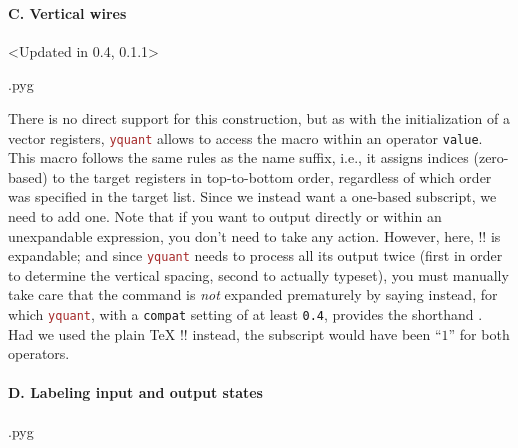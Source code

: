 \documentclass{scrartcl}
\makeatletter
\newenvironment{codeexample}{%
   \VerbatimEnvironment%
   \let\FVB@VerbatimOut\minted@FVB@VerbatimOut
   \let\FVE@VerbatimOut\minted@FVE@VerbatimOut
   \minted@configlang{tex}%
   \minted@fvset
   \begin{VerbatimOut}[codes={\catcode`\^^I=12},firstline,lastline]{\minted@jobname.pyg}%
}{
   \end{VerbatimOut}%
   \minted@langlinenoson%
   \savebox\codeexamplebox{ \minted@jobname.pyg}%
   \ifdim\wd\codeexamplebox>\dimexpr.5\linewidth-3mm\relax%
      \wd\codeexamplebox=.5\linewidth%
   \else%
      \wd\codeexamplebox=\dimexpr\wd\codeexamplebox+3mm\relax%
   \fi%
   \noindent\begin{minipage}{\wd\codeexamplebox}%
      \centering%
      \usebox\codeexamplebox%
   \end{minipage}%
   \begin{minipage}{\dimexpr\linewidth-\wd\codeexamplebox\relax}%
      \expandafter\minted@pygmentize\expandafter{\minted@lang}%
   \end{minipage}%
   \minted@langlinenosoff%
   \par%
}
\def\pkg#1{\textcolor{brown}{\texttt{#1}}}
\def\ttlink{\link\texttt}
\def\texlink{\link\tex}
\def\Yquant{\pkg{yquant}}
\makeatother
\begin{document}
            \paragraph{C. Vertical wires}\leavevmode
               \begin{example}<Updated in 0.4, 0.1.1>
                  \begin{codeexample}
                  \end{codeexample}
                  There is no direct support for this construction, but as with the initialization of a vector registers, \Yquant{} allows to access the macro \texlink{\idx} within an operator \ttlink{value}.
                  This macro follows the same rules as the name suffix, i.e., it assigns indices (zero\hyp based) to the target registers in top\hyp to\hyp bottom order, regardless of which order was specified in the target list.
                  Since we instead want a one\hyp based subscript, we need to add one.
                  Note that if you want to output \texlink{\idx} directly or within an unexpandable expression, you don't need to take any action.
                  However, here, \tex!\the! is expandable; and since \Yquant{} needs to process all its output twice (first in order to determine the vertical spacing, second to actually typeset), you must manually take care that the command is \emph{not} expanded prematurely by saying \texlink[\protect]{\protect\the} instead, for which \Yquant{}, with a \ttlink{compat} setting of at least \texttt{0.4}, provides the shorthand \texlink\The.
                  Had we used the plain \TeX{} \tex!\the! instead, the subscript would have been ``$1$'' for both operators.
               \end{example}

            \paragraph{D. Labeling input and output states}\leavevmode
               \begin{example}
                  \begin{codeexample}
                  \end{codeexample}
               \end{example}
\end{document}
